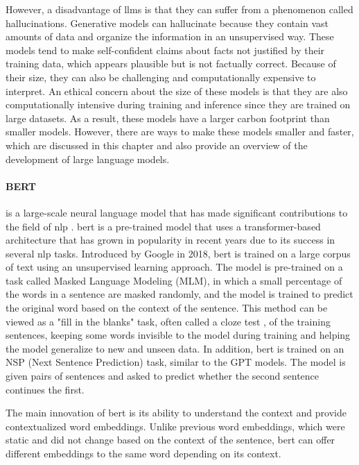     
    However, a disadvantage of \glspl{llm} is that they can suffer from a phenomenon called hallucinations. Generative models can hallucinate because they contain vast amounts of data and organize the information in an unsupervised way. These models tend to make self-confident claims about facts not justified by their training data, which appears plausible but is not factually correct. Because of their size, they can also be challenging and computationally expensive to interpret. An ethical concern about the size of these models is that they are also computationally intensive during training and inference since they are trained on large datasets. As a result, these models have a larger carbon footprint than smaller models. However, there are ways to make these models smaller and faster, which are discussed in this chapter and also provide an overview of the development of large language models.

   

    \paragraph{BERT\\}

     is a large-scale neural language model that has made significant contributions to the field of \gls{nlp} \cite{devlinBERTPretrainingDeep2019}. \gls{bert} is a pre-trained model that uses a transformer-based architecture that has grown in popularity in recent years due to its success in several \gls{nlp} tasks. Introduced by Google in 2018, \gls{bert} is trained on a large corpus of text using an unsupervised learning approach. The model is pre-trained on a task called Masked Language Modeling (MLM), in which a small percentage of the words in a sentence are masked randomly, and the model is trained to predict the original word based on the context of the sentence. This method can be viewed as a "fill in the blanks" task, often called a cloze test \cite{taylorClozeProcedureNew1953}, of the training sentences, keeping some words invisible to the model during training and helping the model generalize to new and unseen data. In addition, \gls{bert} is trained on an NSP (Next Sentence Prediction) task, similar to the GPT models. The model is given pairs of sentences and asked to predict whether the second sentence continues the first.

    The main innovation of \gls{bert} is its ability to understand the context and provide contextualized word embeddings. Unlike previous word embeddings, which were static and did not change based on the context of the sentence, \gls{bert} can offer different embeddings to the same word depending on its context.
    

